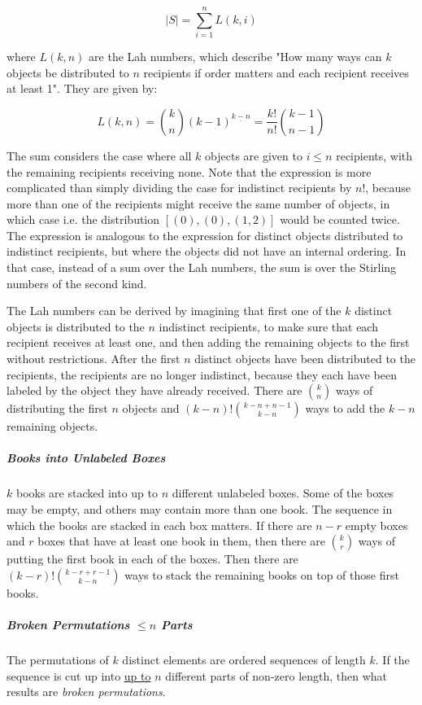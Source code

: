 \begin{equation}
|S| = \sum_{i=1}^n L(k,i) 
\end{equation}

where $L(k,n)$ are the Lah numbers, which describe "How many ways can $k$ objects be distributed to $n$ recipients if order matters and each recipient receives at least 1". They are given by:

\begin{equation}
L(k,n)= {k \choose n} (k-1)^{\underline{k-n}} = \frac{k!}{n!}{ k-1 \choose n-1 }
\end{equation}

The sum considers the case where all $k$ objects are given to $i\leq n$ recipients, with the remaining recipients receiving none. Note that the expression is more complicated than simply dividing the case for indistinct recipients by $n!$, because more than one of the recipients might receive the same number of objects, in which case i.e. the distribution $[(0),(0),(1,2)]$ would be counted twice. The expression is analogous to the expression for distinct objects distributed to indistinct recipients, but where the objects did not have an internal ordering. In that case, instead of a sum over the Lah numbers, the sum is over the Stirling numbers of the second kind. 

The Lah numbers can be derived by imagining that first one of the $k$ distinct objects is distributed to the $n$ indistinct recipients, to make sure that each recipient receives at least one, and then adding the remaining objects to the first without restrictions. After the first $n$ distinct objects have been distributed to the recipients, the recipients are no longer indistinct, because they each have been labeled by the object they have already received. There are ${k \choose n}$ ways of distributing the first $n$ objects and $(k-n)!{k-n+n-1 \choose k-n}$ ways to add the $k-n$ remaining objects.

\subparagraph{Books into Unlabeled Boxes} $k$ books are stacked into up to $n$ different unlabeled boxes. Some of the boxes may be empty, and others may contain more than one book. The sequence in which the books are stacked in each box matters. If there are $n-r$ empty boxes and $r$ boxes that have at least one book in them, then there are ${k \choose r}$ ways of putting the first book in each of the boxes. Then there are $(k-r)!{k-r+r-1 \choose k-n}$ ways to stack the remaining books on top of those first books. 

\subparagraph{Broken Permutations $\leq n$ Parts} The permutations of $k$ distinct elements are ordered sequences of length $k$. If the sequence is cut up into \underline{up to} $n$ different parts of non-zero length, then what results are \textit{broken permutations}.

